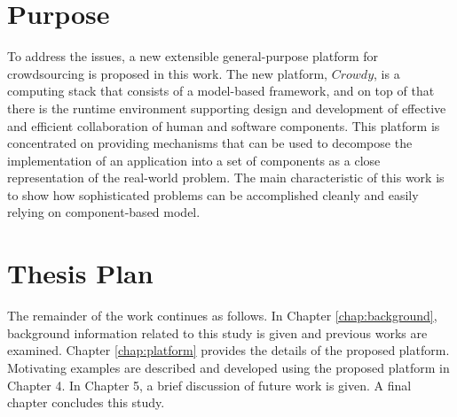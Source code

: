 \section{Purpose}

To address the issues, a new extensible general-purpose platform for crowdsourcing 
is proposed in this work. The new platform, $Crowdy$, is a computing stack that 
consists of a model-based framework, and on top of that there is the runtime environment 
supporting design and development of effective and efficient collaboration of
human and software components. This platform is concentrated on providing 
mechanisms that can be used to decompose the implementation of an application 
into a set of components as a close representation of the real-world problem. 
The main characteristic of this work is to show how sophisticated problems can be 
accomplished cleanly and easily relying on component-based model.


\section{Thesis Plan}

The remainder of the work continues as follows. In Chapter \ref{chap:background}, 
background information related to this study is given and previous works are examined. 
Chapter \ref{chap:platform} provides the details of the proposed platform. Motivating 
examples are described and developed using the proposed platform in Chapter 4. 
In Chapter 5, a brief discussion of future work is given. A final chapter concludes this study.
